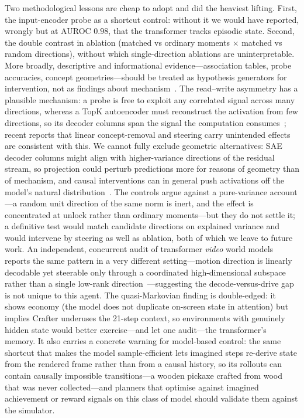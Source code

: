\documentclass[pdflatex,sn-mathphys-num]{sn-jnl}%
\theoremstyle{thmstyleone}%
\theoremstyle{thmstyletwo}%
\theoremstyle{thmstylethree}%
\begin{document}
Two methodological lessons are cheap to adopt and did the heaviest lifting. First, the input-encoder probe as a shortcut control: without it we would have reported, wrongly but at AUROC $0.98$, that the transformer tracks episodic state. Second, the double contrast in ablation (matched vs ordinary moments $\times$ matched vs random directions), without which single-direction ablations are uninterpretable. More broadly, descriptive and informational evidence---association tables, probe accuracies, concept geometries---should be treated as hypothesis generators for intervention, not as findings about mechanism~\cite{belinkov2022probing,atrey2020saliency}. The read--write asymmetry has a plausible mechanism: a probe is free to exploit any correlated signal across many directions, whereas a TopK autoencoder must reconstruct the activation from few directions, so its decoder columns span the signal the computation consumes~\cite{gao2024topk,elhage2022superposition}; recent reports that linear concept-removal and steering carry unintended effects~\cite{gumbelcf2025,goyal2025causal,propprobes2025} are consistent with this. We cannot fully exclude geometric alternatives: SAE decoder columns might align with higher-variance directions of the residual stream, so projection could perturb predictions more for reasons of geometry than of mechanism, and causal interventions can in general push activations off the model's natural distribution~\cite{grant2026divergent}. The controls argue against a pure-variance account---a random unit direction of the same norm is inert, and the effect is concentrated at unlock rather than ordinary moments---but they do not settle it; a definitive test would match candidate directions on explained variance and would intervene by steering as well as ablation, both of which we leave to future work. An independent, concurrent audit of transformer \emph{video} world models reports the same pattern in a very different setting---motion direction is linearly decodable yet steerable only through a coordinated high-dimensional subspace rather than a single low-rank direction~\cite{joseph2026physics}---suggesting the decode-versus-drive gap is not unique to this agent. The quasi-Markovian finding is double-edged: it shows economy (the model does not duplicate on-screen state in attention) but implies Crafter underuses the 21-step context, so environments with genuinely hidden state would better exercise---and let one audit---the transformer's memory. It also carries a concrete warning for model-based control: the same shortcut that makes the model sample-efficient lets imagined steps re-derive state from the rendered frame rather than from a causal history, so its rollouts can contain causally impossible transitions---a wooden pickaxe crafted from wood that was never collected---and planners that optimise against imagined achievement or reward signals on this class of model should validate them against the simulator.
\end{document}
